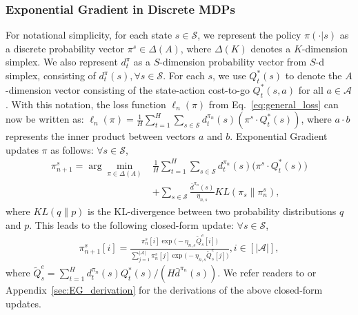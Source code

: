 \documentclass{article}
\newcommand{\BB}[1]{\textcolor{red}{\bf Byron: {#1}}}
\begin{document}
\subsubsection{Exponential Gradient in Discrete MDPs}
For notational simplicity, for each state $s\in\mathcal{S}$, we represent the policy $\pi(\cdot |s)$ as a discrete probability vector $\pi^s \in \Delta(A)$, where $\Delta(K)$ denotes a $K$-dimension simplex. We also represent $d_t^{\pi}$ as a ${S}$-dimension probability vector from $S$-d simplex, consisting of $d_t^{\pi}(s), \forall s\in\mathcal{S}$. 
For each $s$, we use $Q^*_t(s)$ to denote the $A$-dimension vector consisting of the state-action cost-to-go $Q^*_t(s,a)$ for all $a\in\mathcal{A}$. With this notation, the loss function $\ell_n(\pi)$ from Eq.~\ref{eq:general_loss} can now be written as: $\ell_n(\pi) = \frac{1}{H}\sum_{t=1}^H \sum_{s\in\mathcal{S}} d_t^{\pi_n}(s)( \pi^s\cdot Q^*_t(s))$,
where $a\cdot b$ represents the inner product between vectors $a$ and $b$. Exponential Gradient updates $\pi$ as follows: $\forall s\in\mathcal{S}$,
\begin{align}
\label{eq:eg_argmax}
\pi^s_{n+1} = \arg\min_{\pi\in\Delta(A)}&\frac{1}{H}\sum_{t=1}^H \sum_{s\in\mathcal{S}} d_t^{\pi_n}(s)\big( \pi^s\cdot Q^*_t(s)\big) \nonumber \\ &+\sum_{s\in\mathcal{S}}\frac{\bar{d}^{\pi_n}(s)}{\eta_{n,s}}KL(\pi_s \| \pi^s_n), 
\end{align} where $KL(q\|p)$ is the KL-divergence between two probability distributions $q$ and $p$.
This leads to the following closed-form update: $\forall s\in\mathcal{S}$,
\begin{align}
\label{eq:eg_closed_form}
\pi_{n+1}^s[i] = \frac{\pi_n^s[i]\exp\big(-\eta_{n,s} \tilde{Q}_s^e[i]\big)}{\sum_{j=1}^{|\mathcal{A}|}\pi_n^s[j]\exp\big(-\eta_{n,s} \tilde{Q}_s^e[j]\big)}, i\in [|\mathcal{A}|],
\end{align} where $\tilde{Q}_s^e = \sum_{t=1}^H d_t^{\pi_n}(s)Q^*_t(s) / (H\bar{d}^{\pi_n}(s))$. We refer readers to \cite{shalev2012online} or Appendix~\ref{sec:EG_derivation} for the derivations of the above closed-form updates. 
\end{document}
